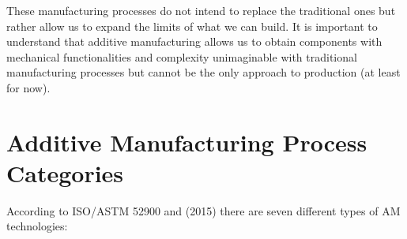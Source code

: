 These manufacturing processes do not intend to replace the traditional ones but rather allow us to expand the limits of what we can build. It is important to understand that additive manufacturing allows us to obtain components with mechanical functionalities and complexity unimaginable with traditional manufacturing processes but cannot be the only approach to production (at least for now).


\section{Additive Manufacturing Process Categories} 
\label{sec:AMproc}
According to ISO/ASTM 52900 \cite{organization_isoastm_2015} and \citeauthor{gibson_additive_2015} (2015) there are seven different types of AM technologies: 

